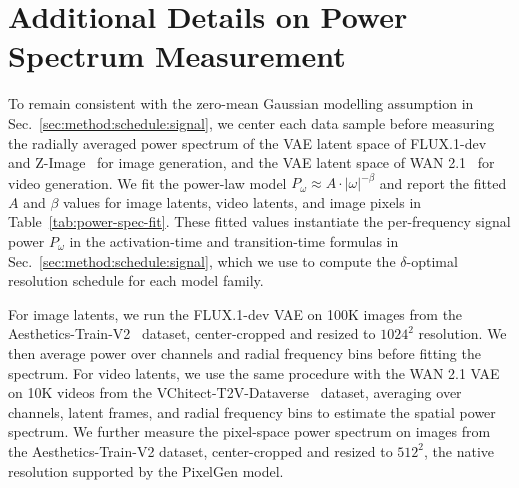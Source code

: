 \section{Additional Details on Power Spectrum Measurement}
\label{sec:power_spec}
To remain consistent with the zero-mean Gaussian modelling assumption in Sec.~\ref{sec:method:schedule:signal}, we center each data sample before measuring the radially averaged power spectrum of the VAE latent space of FLUX.1-dev~\citep{black2024flux} and Z-Image~\citep{zimage} for image generation, and the VAE latent space of WAN 2.1~\citep{wan} for video generation.
We fit the power-law model $P_\omega \approx A \cdot |\omega|^{-\beta}$ and report the fitted $A$ and $\beta$ values for image latents, video latents, and image pixels in Table~\ref{tab:power-spec-fit}.
These fitted values instantiate the per-frequency signal power $P_\omega$ in the activation-time and transition-time formulas in Sec.~\ref{sec:method:schedule:signal}, which we use to compute the $\delta$-optimal resolution schedule for each model family.

For image latents, we run the FLUX.1-dev VAE on 100K images from the Aesthetics-Train-V2~\citep{zhang2025diffusion4k} dataset, center-cropped and resized to $1024^2$ resolution. We then average power over channels and radial frequency bins before fitting the spectrum. For video latents, we use the same procedure with the WAN 2.1 VAE on 10K videos from the VChitect-T2V-Dataverse~\citep{fan2025vchitect} dataset, averaging over channels, latent frames, and radial frequency bins to estimate the spatial power spectrum. We further measure the pixel-space power spectrum on images from the Aesthetics-Train-V2 dataset, center-cropped and resized to $512^2$, the native resolution supported by the PixelGen model.

\begin{table}[h!]
  \centering
  \small
  \caption{\textbf{Power-law fits to measured power spectra.} We fit $P_\omega \approx A \cdot |\omega|^{-\beta}$ on centered samples for image latents, video latents, and image pixels.}
  \label{tab:power-spec-fit}
\end{table}
